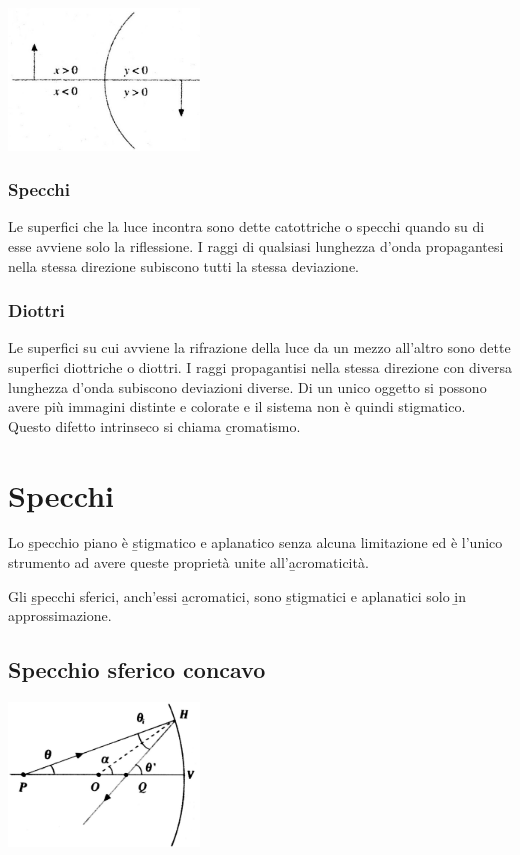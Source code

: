 \begin{center}
\includegraphics[width=2in]{immagini/otticgeom3.jpg}
\end{center}

\subsubsection{Specchi}
Le superfici che la luce incontra sono dette catottriche o specchi quando su di esse avviene solo la riflessione. I raggi di qualsiasi lunghezza d'onda propagantesi nella stessa direzione subiscono tutti la stessa deviazione.

\subsubsection{Diottri}
Le superfici su cui avviene la rifrazione della luce da un mezzo all'altro sono dette superfici diottriche o diottri. I raggi propagantisi nella stessa direzione con diversa lunghezza d'onda subiscono deviazioni diverse. Di un unico oggetto si possono avere più immagini distinte e colorate e il sistema non è quindi stigmatico. Questo difetto intrinseco si chiama \b{cromatismo}.

\section{Specchi}%
Lo \b{specchio piano} è \b{stigmatico e aplanatico} senza alcuna limitazione ed è l'unico strumento ad avere queste proprietà unite all'\b{acromaticità}.

Gli \b{specchi sferici}, anch'essi \b{acromatici}, sono \b{stigmatici e aplanatici} solo \b{in approssimazione}.
\subsection{Specchio sferico concavo}
\begin{center}
\includegraphics[width=2in]{immagini/specchi1.jpg}
\end{center}

